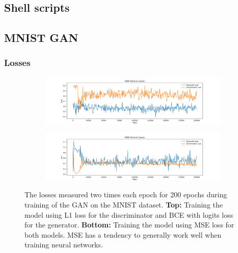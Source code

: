 \documentclass[12pt, fleqn, titlepage]{article}
\begin{document}
\subsection{Shell scripts}


\subsection{MNIST GAN}\label{MNIST_GAN}

\subsubsection{Losses}

\begin{figure}[H]
	\centering
	\begin{subfigure}[b]{0.9\textwidth}
		\centering
		\includegraphics[width=\linewidth]{imgs/MNIST_GAN_normal_losses}
		\label{fig:MNIST_GAN_losses_normal}
	\end{subfigure}
	\hfill
	\begin{subfigure}[b]{0.9\textwidth}
		\centering
		\includegraphics[width=\linewidth]{imgs/MNIST_GAN_mse_losses}
		\label{fig:MNIST_GAN_losses_mse}
	\end{subfigure}
	\caption{The losses measured two times each epoch for 200 epochs during training of the GAN on the MNIST dataset. \textbf{Top:} Training the model using L1 loss for the discriminator and BCE with logits loss for the generator. \textbf{Bottom:} Training the model using MSE loss for both models. MSE has a tendency to generally work well when training neural networks.}
	\label{fig:MNIST_GAN_losses}
\end{figure}
\end{document}
